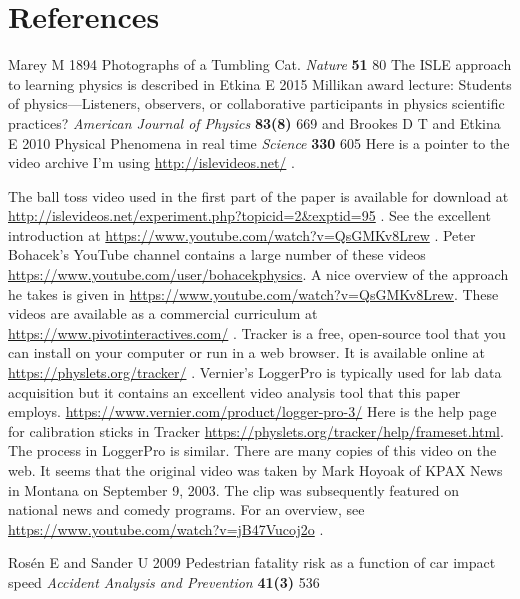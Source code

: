 \documentclass[12pt]{iopart}
\begin{document}
\section*{References}
\begin{thebibliography}{99}
Marey M
1894
Photographs of a Tumbling Cat. 
{\it Nature }
{\bf 51} 
80
The ISLE approach to learning physics is described in 
Etkina E 
2015
Millikan award lecture: Students of physics—Listeners, observers, or collaborative participants in physics scientific practices?
{\it American Journal of Physics}
{\bf 83(8)}
669
and 
Brookes D T and Etkina E
2010
Physical Phenomena in real time
{\it Science}
{\bf 330}
605
Here is a pointer to the video archive I'm using \url{http://islevideos.net/} .
  
The ball toss video used in the first part of the paper is available for download at \url{http://islevideos.net/experiment.php?topicid=2&exptid=95} .
See the excellent introduction at 
\url{https://www.youtube.com/watch?v=QsGMKv8Lrew} .
 Peter Bohacek's YouTube channel contains a large number of these videos \url{https://www.youtube.com/user/bohacekphysics}.  
A nice overview of the approach he takes is given in \url{https://www.youtube.com/watch?v=QsGMKv8Lrew}. 
These videos are available as a commercial curriculum at \url{https://www.pivotinteractives.com/} .
 Tracker is a free, open-source tool that you can install on your computer or run in a web browser.  It is available online at \url{https://physlets.org/tracker/} .
 Vernier's LoggerPro is typically used for lab data acquisition but it contains an excellent video analysis tool that this paper employs. 
\url{https://www.vernier.com/product/logger-pro-3/}
 Here is the help page for calibration sticks in Tracker \url{https://physlets.org/tracker/help/frameset.html}.  The process in LoggerPro is similar.
There are many copies of this video on the web.  It seems that the original video was taken by Mark Hoyoak of KPAX News in Montana on September 9, 2003.  The clip was subsequently featured on national news and comedy programs.  For an overview, see \url{https://www.youtube.com/watch?v=jB47Vucoj2o} .
   
Rosén E and Sander U
2009
Pedestrian fatality risk as a function of car impact speed
{\it Accident Analysis and Prevention}
\textbf{41(3)} 
536
\end{thebibliography}
\end{document}
